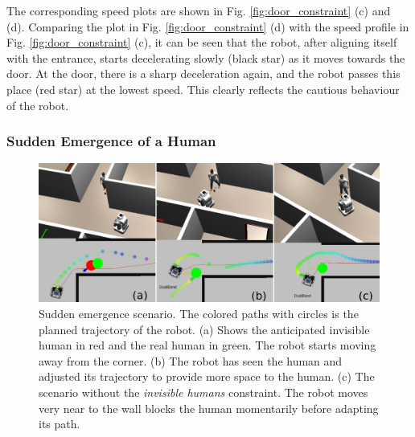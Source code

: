 The corresponding speed plots are shown in Fig. \ref{fig:door_constraint} (c) and (d). Comparing the plot in Fig. \ref{fig:door_constraint} (d) with the speed profile in Fig. \ref{fig:door_constraint} (c), it can be seen that the robot, after aligning itself with the entrance, starts decelerating slowly (black star) as it moves towards the door. At the door, there is a sharp deceleration again, and the robot passes this place (red star) at the lowest speed. This clearly reflects the cautious behaviour of the robot.


\subsubsection{Sudden Emergence of a Human}
 \begin{figure}[!h]
    \centering
    \includegraphics[width=0.9 \columnwidth]{images/chapter5/appear_scene_final_new}
    \caption{Sudden emergence scenario.  The colored paths with circles is the planned trajectory of the robot. (a) Shows the anticipated invisible human in red and the real human in green. The robot starts moving away from the corner. (b) The robot has seen the human and adjusted its trajectory to provide more space to the human. (c) The scenario without the \textit{invisible humans} constraint. The robot moves very near to the wall blocks the human momentarily before adapting its path.}
    \label{fig:emergence}
\end{figure}

